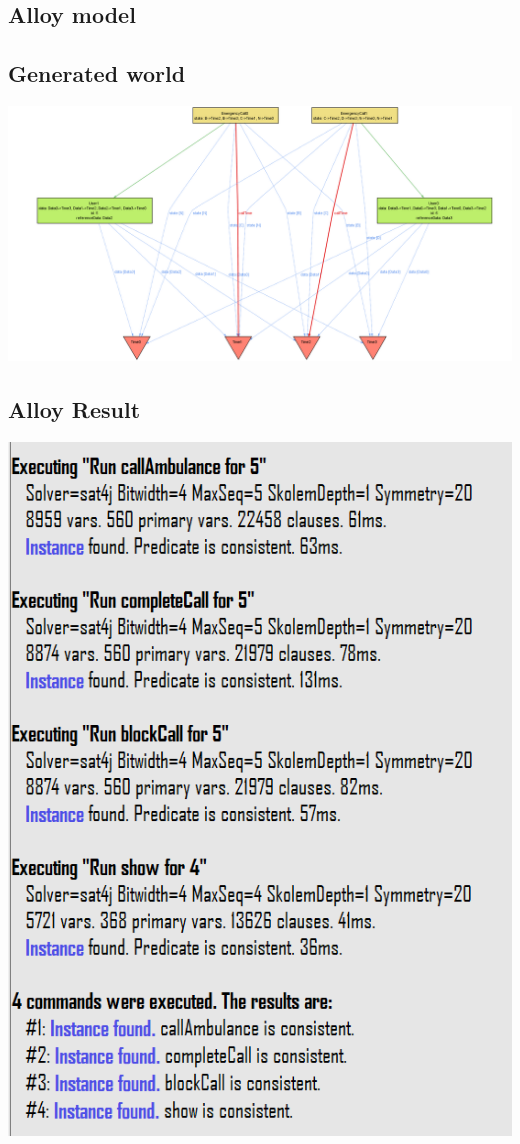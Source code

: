 \subsection{Alloy model}

\subsection{Generated world}
\includegraphics[width = 0.8\textheight, angle=90]{sections/alloy/GenWorldASOS.png}
\subsection{Alloy Result}
\includegraphics[height = 0.8\textheight]{sections/alloy/resultASOS.png}
\clearpage
